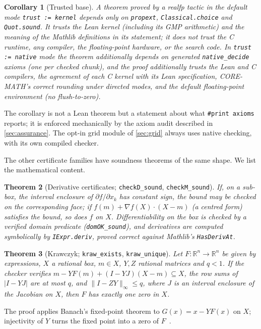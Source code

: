 \documentclass[11pt]{article}
\newtheorem{theorem}{Theorem}
\newtheorem{corollary}[theorem]{Corollary}
\theoremstyle{definition}
\theoremstyle{remark}
\newcommand{\R}{\mathbb{R}}
\newcommand{\lean}[1]{\texttt{#1}}
\newcommand{\realfp}{\textsf{realfp}}
\begin{document}
\begin{corollary}[Trusted base]\label{cor:trust}
A theorem proved by a \realfp{} tactic in the default mode
\lean{trust := kernel} depends only on \lean{propext},
\lean{Classical.choice} and \lean{Quot.sound}. It trusts the Lean kernel
(including its GMP arithmetic) and the meaning of the Mathlib definitions in
its statement; it does not trust the C runtime, any compiler, the
floating-point hardware, or the search code. In \lean{trust := native}
mode the theorem additionally depends on generated
\lean{native\_decide} axioms (one per checked chunk), and the proof additionally trusts the
Lean and C compilers, the agreement of each C kernel with its Lean
specification, CORE-MATH's correct rounding under directed modes, and the
default floating-point environment (no flush-to-zero).
\end{corollary}
The corollary is not a Lean theorem but a statement about what
\lean{\#print axioms} reports; it is enforced mechanically by the axiom audit
described in \cref{sec:assurance}. The opt-in grid module of
\cref{sec:grid} always uses native checking, with its own compiled checker.

The other certificate families have soundness theorems of the same shape.
We list the mathematical content.

\begin{theorem}[Derivative certificates; \lean{checkD\_sound}, \lean{checkM\_sound}]
If, on a sub-box, the interval enclosure of $\partial f/\partial x_k$ has
constant sign, the bound may be checked on the corresponding face; if
$f(m)+\nabla f(X)\cdot(X-m)$ (a centred form) satisfies the bound, so does
$f$ on $X$. Differentiability on the box is checked by a verified domain
predicate (\lean{domOK\_sound}), and derivatives are computed symbolically
by \lean{IExpr.deriv}, proved correct against Mathlib's \lean{HasDerivAt}.
\end{theorem}

\begin{theorem}[Krawczyk; \lean{kraw\_exists}, \lean{kraw\_unique}]
Let $F:\R^n\to\R^n$ be given by expressions, $X$ a rational box, $m\in X$,
$Y,Z$ rational matrices and $q<1$. If the checker verifies
$m-YF(m)+(I-YJ)(X-m)\subseteq X$, the row sums of $|I-YJ|$ are at most $q$,
and $\|I-ZY\|_\infty\le q$, where $J$ is an interval enclosure of the
Jacobian on $X$, then $F$ has exactly one zero in $X$.
\end{theorem}
The proof applies Banach's fixed-point theorem to $G(x)=x-YF(x)$ on $X$;
injectivity of $Y$ turns the fixed point into a zero of $F$~\cite{krawczyk1969}.
\end{document}
